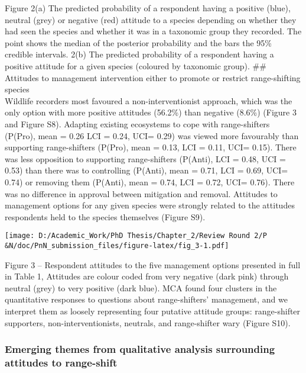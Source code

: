 \documentclass[
]{article}
\begin{document}
Figure 2(a) The predicted probability of a respondent having a positive
(blue), neutral (grey) or negative (red) attitude to a species depending
on whether they had seen the species and whether it was in a taxonomic
group they recorded. The point shows the median of the posterior
probability and the bars the 95\% credible intervals. 2(b) The predicted
probability of a respondent having a positive attitude for a given
species (coloured by taxonomic group). \#\# Attitudes to management
intervention either to promote or restrict range-shifting species\\
Wildlife recorders most favoured a non-interventionist approach, which
was the only option with more positive attitudes (56.2\%) than negative
(8.6\%) (Figure 3 and Figure S8). Adapting existing ecosystems to cope
with range-shifters (P(Pro), mean = 0.26 LCI = 0.24, UCI= 0.29) was
viewed more favourably than supporting range-shifters (P(Pro), mean =
0.13, LCI = 0.11, UCI= 0.15). There was less opposition to supporting
range-shifters (P(Anti), LCI = 0.48, UCI = 0.53) than there was to
controlling (P(Anti), mean = 0.71, LCI = 0.69, UCI= 0.74) or removing
them (P(Anti), mean = 0.74, LCI = 0.72, UCI= 0.76). There was no
difference in approval between mitigation and removal. Attitudes to
management options for any given species were strongly related to the
attitudes respondents held to the species themselves (Figure S9).

\texttt{[image: D:/Academic\_Work/PhD Thesis/Chapter\_2/Review Round 2/P\\\&N/doc/PnN\_submission\_files/figure-latex/fig\_3-1.pdf]}

Figure 3 -- Respondent attitudes to the five management options
presented in full in Table 1, Attitudes are colour coded from very
negative (dark pink) through neutral (grey) to very positive (dark
blue). MCA found four clusters in the quantitative responses to
questions about range-shifters' management, and we interpret them as
loosely representing four putative attitude groups: range-shifter
supporters, non-interventionists, neutrals, and range-shifter wary
(Figure S10).

\hypertarget{emerging-themes-from-qualitative-analysis-surrounding-attitudes-to-range-shift}{%
\subsubsection{Emerging themes from qualitative analysis surrounding
attitudes to
range-shift}\label{emerging-themes-from-qualitative-analysis-surrounding-attitudes-to-range-shift}}
\end{document}
